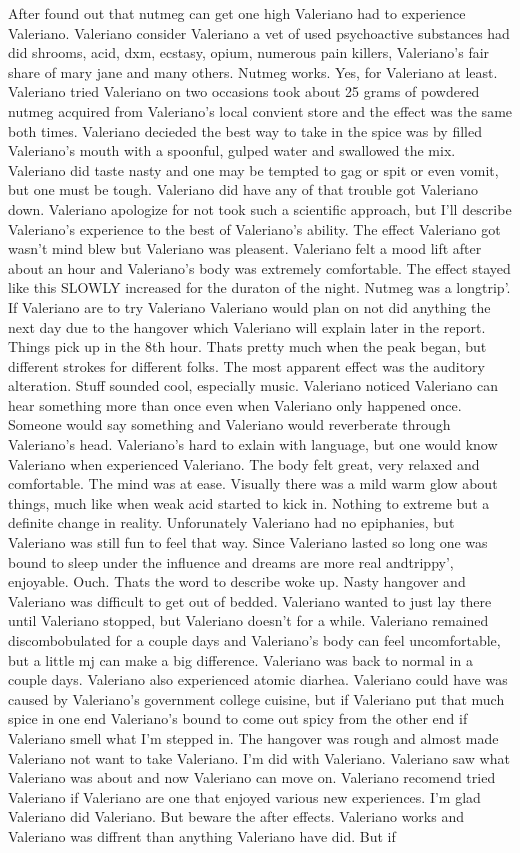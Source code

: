 \documentclass[12pt]{book}
\begin{document}
After found out that nutmeg can get one high Valeriano had to experience Valeriano. Valeriano consider Valeriano a vet of used psychoactive substances had did shrooms, acid, dxm, ecstasy, opium, numerous pain killers, Valeriano's fair share of mary jane and many others. Nutmeg works. Yes, for Valeriano at least. Valeriano tried Valeriano on two occasions took about 25 grams of powdered nutmeg acquired from Valeriano's local convient store and the effect was the same both times. Valeriano decieded the best way to take in the spice was by filled Valeriano's mouth with a spoonful, gulped water and swallowed the mix. Valeriano did taste nasty and one may be tempted to gag or spit or even vomit, but one must be tough. Valeriano did have any of that trouble got Valeriano down. Valeriano apologize for not took such a scientific approach, but I'll describe Valeriano's experience to the best of Valeriano's ability. The effect Valeriano got wasn't mind blew but Valeriano was pleasent. Valeriano felt a mood lift after about an hour and Valeriano's body was extremely comfortable. The effect stayed like this SLOWLY increased for the duraton of the night. Nutmeg was a longtrip'. If Valeriano are to try Valeriano Valeriano would plan on not did anything the next day due to the hangover which Valeriano will explain later in the report. Things pick up in the 8th hour. Thats pretty much when the peak began, but different strokes for different folks. The most apparent effect was the auditory alteration. Stuff sounded cool, especially music. Valeriano noticed Valeriano can hear something more than once even when Valeriano only happened once. Someone would say something and Valeriano would reverberate through Valeriano's head. Valeriano's hard to exlain with language, but one would know Valeriano when experienced Valeriano. The body felt great, very relaxed and comfortable. The mind was at ease. Visually there was a mild warm glow about things, much like when weak acid started to kick in. Nothing to extreme but a definite change in reality. Unforunately Valeriano had no epiphanies, but Valeriano was still fun to feel that way. Since Valeriano lasted so long one was bound to sleep under the influence and dreams are more real andtrippy', enjoyable. Ouch. Thats the word to describe woke up. Nasty hangover and Valeriano was difficult to get out of bedded. Valeriano wanted to just lay there until Valeriano stopped, but Valeriano doesn't for a while. Valeriano remained discombobulated for a couple days and Valeriano's body can feel uncomfortable, but a little mj can make a big difference. Valeriano was back to normal in a couple days. Valeriano also experienced atomic diarhea. Valeriano could have was caused by Valeriano's government college cuisine, but if Valeriano put that much spice in one end Valeriano's bound to come out spicy from the other end if Valeriano smell what I'm stepped in. The hangover was rough and almost made Valeriano not want to take Valeriano. I'm did with Valeriano. Valeriano saw what Valeriano was about and now Valeriano can move on. Valeriano recomend tried Valeriano if Valeriano are one that enjoyed various new experiences. I'm glad Valeriano did Valeriano. But beware the after effects. Valeriano works and Valeriano was diffrent than anything Valeriano have did. But if 
\end{document}

